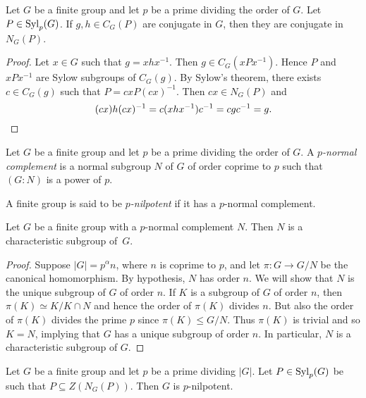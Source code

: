 \begin{lemma}
	\label{lem:normal_complement}
	Let $G$ be a finite group and let $p$ be a prime dividing the order of $G$. Let $P\in\mathrm{Syl}_p(G)$. If $g,h\in C_G(P)$ are conjugate in $G$, then they are conjugate in $N_G(P)$.
\end{lemma}

\begin{proof}
	Let $x\in G$ such that $g=xhx^{-1}$. Then $g\in C_G(xPx^{-1})$. Hence $P$ and $xPx^{-1}$ are Sylow subgroups of $C_G(g)$. By Sylow's theorem, there exists $c\in C_G(g)$ such that $P=cxP(cx)^{-1}$. Then $cx\in N_G(P)$ and 
	\[
	(cx)h(cx)^{-1}=c(xhx^{-1})c^{-1}=cgc^{-1}=g.\qedhere
	\]
\end{proof}

\begin{definition}
	Let $G$ be a finite group and let $p$ be a prime dividing the order of $G$. A \emph{$p$-normal complement} is a normal subgroup $N$ of $G$ of order coprime to $p$ such that $(G:N)$ is a power of $p$.
\end{definition}

\begin{definition}
	A finite group is said to be \emph{$p$-nilpotent} 
    if it has a $p$-normal complement.
\end{definition}

\begin{proposition}
	Let $G$ be a finite group with a $p$-normal complement $N$. Then 
    $N$ is a characteristic subgroup of~$G$.
\end{proposition}

\begin{proof}
	Suppose $|G|=p^\alpha n$, where $n$ is coprime to $p$, and let $\pi\colon G\to G/N$ be the canonical homomorphism. By hypothesis, $N$ has order $n$. We will show that $N$ is the unique subgroup of $G$ of order $n$. If $K$ is a subgroup of $G$ of order $n$, then $\pi(K)\simeq K/K\cap N$ and hence the order of $\pi(K)$ divides $n$. But also the order of $\pi(K)$ divides the prime $p$ since $\pi(K)\leq G/N$. Thus $\pi(K)$ is trivial and so $K=N$, 
    implying that $G$ has a unique subgroup of order $n$. In particular, $N$ is a characteristic subgroup of $G$.
\end{proof}

\begin{theorem}
	\label{thm:Burnside:normal_complement}
	Let $G$ be a finite group and let $p$ be a prime dividing $|G|$. Let $P\in\mathrm{Syl}_p(G)$ be such that $P\subseteq Z(N_G(P))$. 
    Then $G$ is $p$-nilpotent.
\end{theorem}

